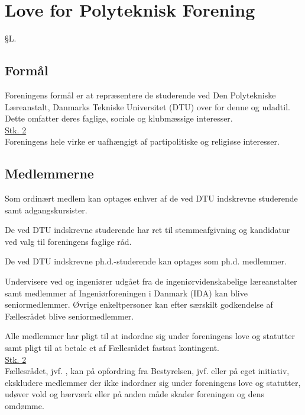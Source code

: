 \setcounter{section}{12}
\section*{Love for Polyteknisk Forening}

\begin{list}
{\S L.}{}




\subsection{Formål}\label{L:kap:Formaal}
\item Foreningens formål er at repræsentere de studerende ved Den Polytekniske Læreanstalt, Danmarks Tekniske Universitet (DTU) over for denne og udadtil. Dette omfatter deres faglige, sociale og klubmæssige interesser. \\

\underline{Stk. 2} \\
Foreningens hele virke er uafhængigt af partipolitiske og religiøse interesser.

\subsection{Medlemmerne}
\label{L:kap:medlemmerne}
\item Som ordinært medlem kan optages enhver af de ved DTU indskrevne studerende samt adgangskursister.
\item De ved DTU indskrevne studerende har ret til stemmeafgivning og kandidatur ved valg til foreningens faglige råd.
\item De ved DTU indskrevne ph.d.-studerende kan optages som ph.d. medlemmer.

\item Undervisere ved og ingeniører udgået fra de ingeniørvidenskabelige læreanstalter samt medlemmer af         Ingeniørforeningen i Danmark (IDA) kan blive seniormedlemmer. Øvrige enkeltpersoner kan efter særskilt godkendelse af Fællesrådet blive seniormedlemmer.
\item \label{L:Medlem:Pligt} Alle medlemmer har pligt til at indordne sig under foreningens love og statutter samt pligt til at betale et af Fællesrådet fastsat kontingent.\\

\underline{Stk. 2} \\
Fællesrådet, jvf. , kan på opfordring fra Bestyrelsen, jvf.  eller på eget initiativ, ekskludere medlemmer der ikke indordner sig under foreningens love og statutter, udøver vold og hærværk eller på anden måde skader foreningen og dens omdømme.\\


\end{list}
